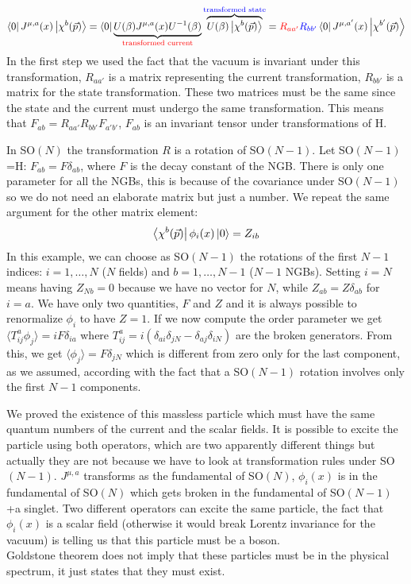 \documentclass[../main.tex]{subfiles}
\begin{document}
\[
\bra{0}J^{\mu,a}(x)\ket{\chi^b(\Vec{p})}=\bra{0}\underbrace{U(\beta)J^{\mu,a}(x)U^{-1}(\beta)}_{{\color{red}{\text{transformed current}}}}\overbrace{U(\beta)\ket{\chi^b(\Vec{p})}}^{{\color{blue}{\text{transformed state}}}}={\color{red}{R_{aa'}}}{\color{blue}{R_{bb'}}}\bra{0}J^{\mu,a'}(x)\ket{\chi^{b'}(\Vec{p})}
\]
In the first step we used the fact that the vacuum is invariant under this transformation, $R_{aa'}$ is a matrix representing the current transformation, $R_{bb'}$ is a matrix for the state transformation. These two matrices must be the same since the state and the current must undergo the same transformation. This means that $F_{ab}=R_{aa'}R_{bb'}F_{a'b'}$, $F_{ab}$ is an invariant tensor under transformations of H.
\begin{example}
In SO$(N)$ the transformation $R$ is a rotation of SO$(N-1)$. Let SO$(N-1)$=H: $F_{ab}=F\delta_{ab}$, where $F$ is the decay constant of the NGB. There is only one parameter for all the NGBs, this is because of the covariance under SO$(N-1)$ so we do not need an elaborate matrix but just a number. We repeat the same argument for the other matrix element:
\[
\bra{\chi^b(\Vec{p})}\phi_i(x)\ket{0}=Z_{ib}
\]
In this example, we can choose as SO$(N-1)$ the rotations of the first $N-1$ indices: $i=1,\dots,N$ ($N$ fields) and $b=1,\dots,N-1$ ($N-1$ NGBs). Setting $i=N$ means having $Z_{Nb}=0$ because we have no vector for $N$, while $Z_{ab}=Z\delta_{ab}$ for $i=a$. We have only two quantities, $F$ and $Z$ and it is always possible to renormalize $\phi_i$ to have $Z=1$. If we now compute the order parameter we get $\langle T_{ij}^a\phi_j\rangle=iF\delta_{ia}$ where $T_{ij}^a=i(\delta_{ai}\delta_{jN}-\delta_{aj}\delta_{iN})$ are the broken generators. From this, we get $\langle\phi_j\rangle=F\delta_{jN}$ which is different from zero only for the last component, as we assumed, according with the fact that a SO$(N-1)$ rotation involves only the first $N-1$ components.
\end{example}
We proved the existence of this massless particle which must have the same quantum numbers of the current and the scalar fields. It is possible to excite the particle using both operators, which are two apparently different things but actually they are not because we have to look at transformation rules under SO$(N-1)$. $J^{\mu,a}$ transforms as the fundamental of SO$(N)$, $\phi_i(x)$ is in the fundamental of SO$(N)$ which gets broken in the fundamental of SO$(N-1)$+a singlet. Two different operators can excite the same particle, the fact that $\phi_i(x)$ is a scalar field (otherwise it would break Lorentz invariance for the vacuum) is telling us that this particle must be a boson. \\
Goldstone theorem does not imply that these particles must be in the physical spectrum, it just states that they must exist.
\end{document}
